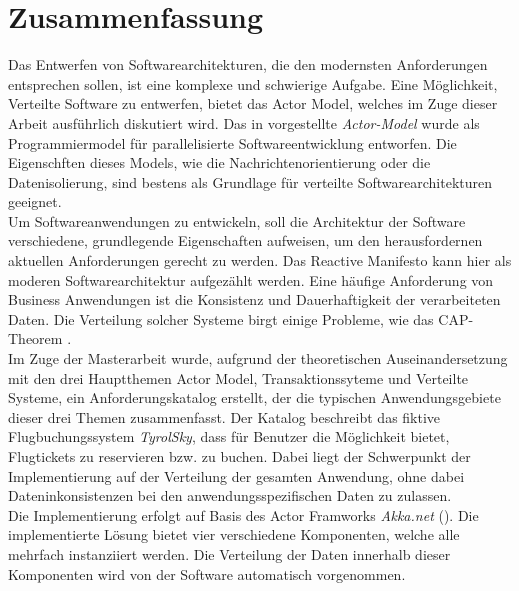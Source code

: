\chapter*{Zusammenfassung}
Das Entwerfen von Softwarearchitekturen, die den modernsten Anforderungen entsprechen sollen, ist eine komplexe und schwierige Aufgabe. Eine Möglichkeit, Verteilte Software zu entwerfen, bietet das Actor Model, welches im Zuge dieser Arbeit ausführlich diskutiert wird. Das in \cite{Hewitt1973AIntelligence} vorgestellte \textit{Actor-Model} wurde als Programmiermodel für parallelisierte Softwareentwicklung entworfen. Die Eigenschften dieses Models, wie die Nachrichtenorientierung oder die Datenisolierung, sind bestens als Grundlage für verteilte Softwarearchitekturen geeignet. \\
Um Softwareanwendungen zu entwickeln, soll die Architektur der Software verschiedene, grundlegende Eigenschaften aufweisen, um den herausfordernen aktuellen Anforderungen gerecht zu werden. Das Reactive Manifesto kann hier als moderen Softwarearchitektur aufgezählt werden.
Eine häufige Anforderung von Business Anwendungen ist die Konsistenz und Dauerhaftigkeit der verarbeiteten Daten. Die Verteilung solcher Systeme birgt einige Probleme, wie das CAP-Theorem \citep{gilbertPerspectiveCAPTheorem2012}. \\
Im Zuge der Masterarbeit wurde, aufgrund der theoretischen Auseinandersetzung mit den drei Hauptthemen Actor Model, Transaktionssyteme und Verteilte Systeme, ein Anforderungskatalog erstellt, der die typischen Anwendungsgebiete dieser drei Themen zusammenfasst. Der Katalog beschreibt das fiktive Flugbuchungssystem \textit{TyrolSky}, dass für Benutzer die Möglichkeit bietet, Flugtickets zu reservieren bzw. zu buchen. Dabei liegt der Schwerpunkt der Implementierung auf der Verteilung der gesamten Anwendung, ohne dabei Dateninkonsistenzen bei den anwendungsspezifischen Daten zu zulassen. \\
Die Implementierung erfolgt auf Basis des Actor Framworks \textit{Akka.net} (\cite{Akka.netCommunityAkka.NETDocumentation}). Die implementierte Lösung bietet vier verschiedene Komponenten, welche alle mehrfach instanziiert werden. Die Verteilung der Daten innerhalb dieser Komponenten wird von der Software automatisch vorgenommen.

\cleardoublepage
